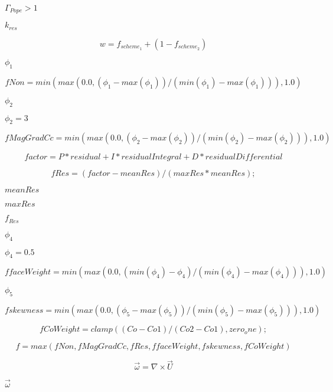 \documentclass{article}
\begin{document}
$\Gamma_{Pope} > 1$
\pagebreak

$k_{res}$
\pagebreak

\[
    w = f_{scheme_1} + (1 - f_{scheme_2})
\]
\pagebreak

$\phi_1$
\pagebreak

\[
    fNon =
        min
        (
            max
            (
                0.0,
                (\phi_1 - max(\phi_1))
                /(min(\phi_1) - max(\phi_1))
            ),
            1.0
        )
\]
\pagebreak

$\phi_2$
\pagebreak

$\phi_2 = 3$
\pagebreak

\[
    fMagGradCc =
        min
        (
            max
            (
                0.0,
                (\phi_2 - max(\phi_2))
                / (min(\phi_2) - max(\phi_2))
            ),
            1.0
        )
\]
\pagebreak

\[
    factor =
        P*residual
        + I*residualIntegral
        + D*residualDifferential
\]
\pagebreak

\[
    fRes = (factor - meanRes)/(maxRes*meanRes);
\]
\pagebreak

$        meanRes $
\pagebreak

$        maxRes  $
\pagebreak

$f_{Res}$
\pagebreak

$\phi_4$
\pagebreak

$\phi_4 = 0.5$
\pagebreak

\[
        ffaceWeight = min
        (
            max
            (
                0.0,
                (min(\phi_4) - \phi_4)
                / (min(\phi_4) - max(\phi_4))
            ),
            1.0
        )
    \]
\pagebreak

$\phi_5$
\pagebreak

\[
        fskewness =
        min
        (
            max
            (
                0.0,
                (\phi_5    - max(\phi_5))
                / (min(\phi_5) - max(\phi_5))
            ),
            1.0
        )
    \]
\pagebreak

\[
        fCoWeight = clamp((Co - Co1)/(Co2 - Co1), zero_one{});
    \]
\pagebreak

\[
        f = max(fNon, fMagGradCc, fRes, ffaceWeight, fskewness, fCoWeight)
    \]
\pagebreak

\[
    \vec \omega = \nabla \times \vec U
\]
\pagebreak

$        \vec \omega   $
\pagebreak
\end{document}
